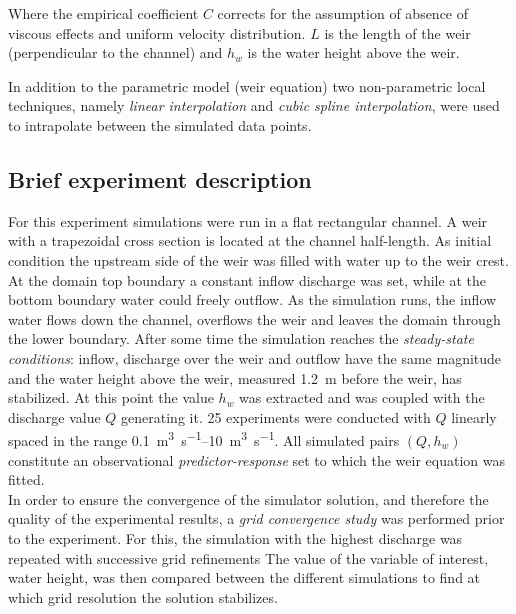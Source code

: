 \noindent Where the empirical coefficient $C$ corrects for the assumption of absence of viscous effects and uniform velocity distribution. $L$ is the length of the weir (perpendicular to the channel) and $h_w$ is the water height above the weir.

In addition to the parametric model (weir equation) two non-parametric local techniques, namely \emph{linear interpolation} and \emph{cubic spline interpolation}, were used to intrapolate between the simulated data points.\\


\subsection{Brief experiment description}

 
For this experiment simulations were run in a flat rectangular channel.
A weir with a trapezoidal cross section is located at the channel half-length.
As initial condition the upstream side of the weir was filled with water up to the weir crest.
At the domain top boundary a constant inflow discharge was set, while at the bottom boundary water could freely outflow.
As the simulation runs, the inflow water flows down the channel, overflows the weir and leaves the domain through the lower boundary.
After some time the simulation reaches the \emph{steady-state conditions}: inflow, discharge over the weir and outflow have the same magnitude and the water height above the weir, measured \SI{1.2}{\meter} before the weir, has stabilized.
At this point the value $h_w$ was extracted and was coupled with the discharge value $Q$ generating it.
\num{25} experiments were conducted with $Q$ linearly spaced in the range \SIrange{0.1}{10}{\cubic\meter\per\second}.
All simulated pairs $(Q, h_w)$ constitute an observational \emph{predictor-response} set to which the weir equation was fitted.
 \\

In order to ensure the convergence of the simulator solution, and therefore the quality of the experimental results, a \emph{grid convergence study} was performed prior to the experiment.
For this, the simulation with the highest discharge was repeated with successive grid refinements
The value of the variable of interest, water height, was then compared between the different simulations to find at which grid resolution the solution stabilizes.


